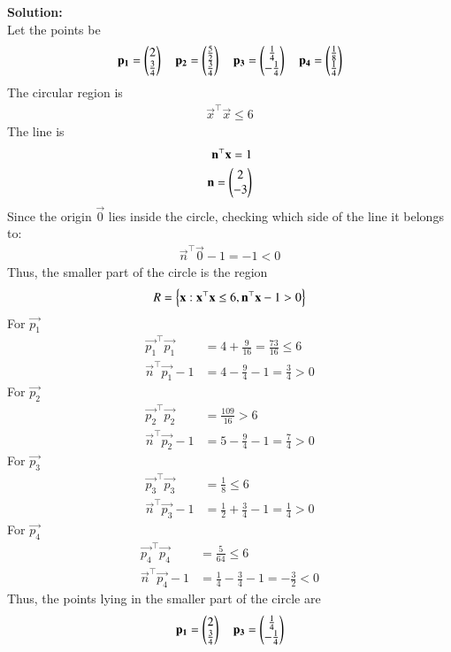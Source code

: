 \documentclass[journal]{IEEEtran}
\begin{document}
\textbf{Solution:}\\
Let the points be 
\begin{align}
    \mathbf{p_1} = \begin{pmatrix}2\\ \frac{3}{4}\end{pmatrix} \quad \mathbf{p_2} = \begin{pmatrix}\frac{5}{2}\\ \frac{3}{4}\end{pmatrix} \quad \mathbf{p_3} = \begin{pmatrix}\frac{1}{4}\\ -\frac{1}{4}\end{pmatrix} \quad \mathbf{p_4} = \begin{pmatrix}\frac{1}{8}\\ \frac{1}{4}\end{pmatrix}
\end{align}
The circular region is 
\begin{align}
    \vec{x}^\top \vec{x} \leq 6
\end{align}
The line is
\begin{align}
    \mathbf{n}^\top \mathbf{x} = 1\\
    \mathbf{n} = \begin{pmatrix}2\\-3\end{pmatrix}
\end{align}
Since the origin $\vec{0}$ lies inside the circle, checking which side of the line it belongs to:
\begin{align}
    \vec{n}^\top \vec{0} - 1 = -1 < 0
\end{align}
Thus, the smaller part of the circle is the region
\begin{align}
    R = \left\{\mathbf{x} : \mathbf{x}^\top \mathbf{x} \leq 6,  \mathbf{n}^\top \mathbf{x} - 1 > 0\right\}
\end{align}
For $\vec{p_1}$ 
\begin{align}
  \vec{p_1}^\top \vec{p_1} &= 4 + \frac{9}{16} = \frac{73}{16} \leq 6  \\
  \vec{n}^\top \vec{p_1} - 1 &= 4 - \frac{9}{4} - 1 = \frac{3}{4} > 0
\end{align}
For $\vec{p_2}$
\begin{align}
    \vec{p_2}^\top \vec{p_2} &= \frac{109}{16} > 6\\
    \vec{n}^\top \vec{p_2} - 1 &= 5 - \frac{9}{4} - 1 = \frac{7}{4} > 0
\end{align}
For $\vec{p_3}$
\begin{align}
\vec{p_3}^\top \vec{p_3} &= \frac{1}{8} \leq 6\\
\vec{n}^\top \vec{p_3} - 1 &= \frac{1}{2}+\frac{3}{4}-1 = \frac{1}{4} > 0
\end{align}
For $\vec{p_4}$
\begin{align}
\vec{p_4}^\top \vec{p_4} &= \frac{5}{64} \leq 6\\
\vec{n}^\top \vec{p_4} - 1 &= \frac{1}{4} - \frac{3}{4} - 1 = -\frac{3}{2} < 0
\end{align}
Thus, the points lying in the smaller part of the circle are
\begin{align}
    \mathbf{p_1} = \begin{pmatrix}2\\ \frac{3}{4}\end{pmatrix} \quad \mathbf{p_3} = \begin{pmatrix}\frac{1}{4}\\ -\frac{1}{4}\end{pmatrix}
\end{align}
\end{document}
